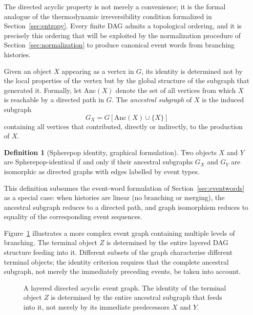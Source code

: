 \documentclass[12pt]{article}
\theoremstyle{plain}
\theoremstyle{definition}
\newtheorem{definition}[theorem]{Definition}
\theoremstyle{remark}
\begin{document}
The directed acyclic property is not merely a convenience; it is the formal
analogue of the thermodynamic irreversibility condition formalized in
Section~\ref{sec:entropy}.  Every finite DAG admits a topological ordering, and
it is precisely this ordering that will be exploited by the normalization
procedure of Section~\ref{sec:normalization} to produce canonical event words
from branching histories.

Given an object $X$ appearing as a vertex in $G$, its identity is determined
not by the local properties of the vertex but by the global structure of the
subgraph that generated it.  Formally, let $\mathrm{Anc}(X)$ denote the set of
all vertices from which $X$ is reachable by a directed path in $G$.  The
\emph{ancestral subgraph} of $X$ is the induced subgraph
\[
  G_X = G[\mathrm{Anc}(X) \cup \{X\}]
\]
containing all vertices that contributed, directly or indirectly, to the
production of $X$.

\begin{definition}[Spherepop identity, graphical formulation]
Two objects $X$ and $Y$ are Spherepop-identical if and only if their
ancestral subgraphs $G_X$ and $G_Y$ are isomorphic as directed graphs with
edges labelled by event types.
\end{definition}

This definition subsumes the event-word formulation of Section~\ref{sec:eventwords}
as a special case: when histories are linear (no branching or merging), the
ancestral subgraph reduces to a directed path, and graph isomorphism reduces to
equality of the corresponding event sequences.

Figure~\ref{fig:dag} illustrates a more complex event graph containing multiple
levels of branching.  The terminal object $Z$ is determined by the entire
layered DAG structure feeding into it.  Different subsets of the graph
characterise different terminal objects; the identity criterion requires that
the complete ancestral subgraph, not merely the immediately preceding events,
be taken into account.

\begin{figure}[ht]
\centering
{}
\caption{A layered directed acyclic event graph.  The identity of the terminal
object $Z$ is determined by the entire ancestral subgraph that feeds into it,
not merely by its immediate predecessors $X$ and $Y$.}
\label{fig:dag}
\end{figure}
\end{document}
